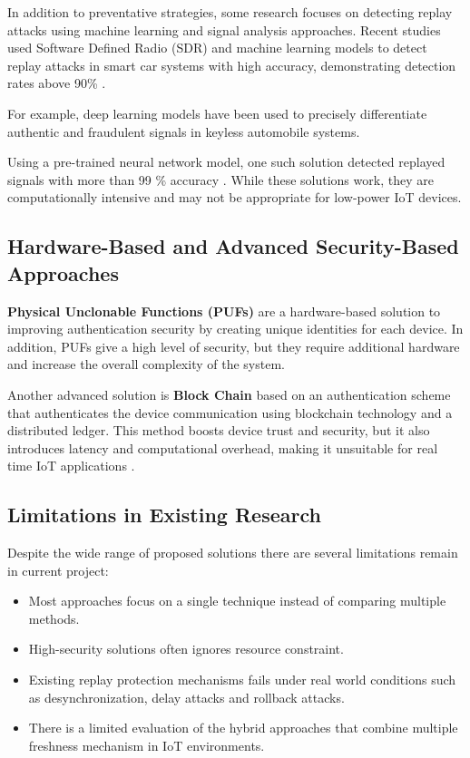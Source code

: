 \documentclass[a4paper,man,12pt]{article}
\begin{document}
In addition to preventative strategies, some research focuses on detecting replay attacks using machine learning and signal analysis approaches. Recent studies used Software Defined Radio (SDR) and machine learning models to detect replay attacks in smart car systems with high accuracy, demonstrating detection rates above 90\% \parencite{006B}.

For example, deep learning models have been used to precisely differentiate authentic and fraudulent signals in keyless automobile systems.\bigbreak

Using a pre-trained neural network model, one such solution detected replayed signals with more than 99 \% accuracy \parencite{003}. While these solutions work, they are computationally intensive and may not be appropriate for low-power IoT devices.

\subsection{Hardware-Based and Advanced Security-Based Approaches}
  
\textbf{ Physical Unclonable Functions (PUFs)} are a hardware-based solution to improving authentication security by creating unique identities for each device. In addition, PUFs give a high level of security, but they require additional hardware and increase the overall complexity of the system\parencite{007}. \bigbreak

Another advanced solution is \textbf{Block Chain} based on an authentication scheme that authenticates the device communication using blockchain technology and a distributed ledger. This method boosts device trust and security, but it also introduces latency and computational overhead, making it unsuitable for real time IoT applications \parencite{008}.

\subsection{Limitations in Existing Research}

Despite the wide range of proposed solutions there are several limitations remain in current project:

\begin{itemize}
  \item Most approaches focus on a single technique instead of comparing multiple methods.
  \item High-security solutions often ignores resource constraint.
  \item Existing replay protection mechanisms fails under real world conditions such as desynchronization, delay attacks and rollback attacks.
  \item There is a limited evaluation of the hybrid approaches that combine multiple freshness mechanism in IoT environments.
\end{itemize}
\end{document}
